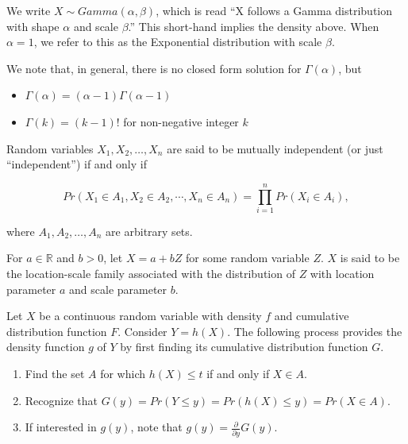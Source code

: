 \documentclass[
  letterpaper,
  DIV=11,
  numbers=noendperiod]{scrreprt}
\providecommand{\tightlist}{%
  \setlength{\itemsep}{0pt}\setlength{\parskip}{0pt}}\usepackage{longtable,booktabs,array}
\theoremstyle{plain}
\theoremstyle{definition}
\theoremstyle{definition}
\theoremstyle{remark}
\begin{document}
We write \(X \sim Gamma\left(\alpha, \beta\right)\), which is read ``X
follows a Gamma distribution with shape \(\alpha\) and scale
\(\beta\).'' This short-hand implies the density above. When
\(\alpha = 1\), we refer to this as the Exponential distribution with
scale \(\beta\).

We note that, in general, there is no closed form solution for
\(\Gamma(\alpha)\), but

\begin{itemize}
\tightlist
\item
  \(\Gamma(\alpha) = (\alpha - 1) \Gamma(\alpha - 1)\)
\item
  \(\Gamma(k) = (k - 1)!\) for non-negative integer \(k\)
\end{itemize}

\begin{description}
\tightlist
\item[Independence (Definition~\ref{def-independence})]
Random variables \(X_1, X_2, \dotsc, X_n\) are said to be mutually
independent (or just ``independent'') if and only if
\end{description}

\[Pr\left(X_1 \in A_1, X_2 \in A_2, \dotsb, X_n \in A_n\right) = \prod_{i=1}^{n} Pr\left(X_i \in A_i\right),\]

where \(A_1, A_2, \dotsc, A_n\) are arbitrary sets.

\begin{description}
\tightlist
\item[Location-Scale Family (Definition~\ref{def-location-scale})]
For \(a \in \mathbb{R}\) and \(b > 0\), let \(X = a + bZ\) for some
random variable \(Z\). \(X\) is said to be the location-scale family
associated with the distribution of \(Z\) with location parameter \(a\)
and scale parameter \(b\).
\item[Method of Distribution Functions
(Definition~\ref{def-method-of-distribution-functions})]
Let \(X\) be a continuous random variable with density \(f\) and
cumulative distribution function \(F\). Consider \(Y = h(X)\). The
following process provides the density function \(g\) of \(Y\) by first
finding its cumulative distribution function \(G\).
\end{description}

\begin{enumerate}
\def\labelenumi{\arabic{enumi}.}
\tightlist
\item
  Find the set \(A\) for which \(h(X) \leq t\) if and only if
  \(X \in A\).
\item
  Recognize that
  \(G(y) = Pr(Y \leq y) = Pr\left(h(X) \leq y\right) = Pr(X \in A)\).
\item
  If interested in \(g(y)\), note that
  \(g(y) = \frac{\partial}{\partial y} G(y)\).
\end{enumerate}
\end{document}
